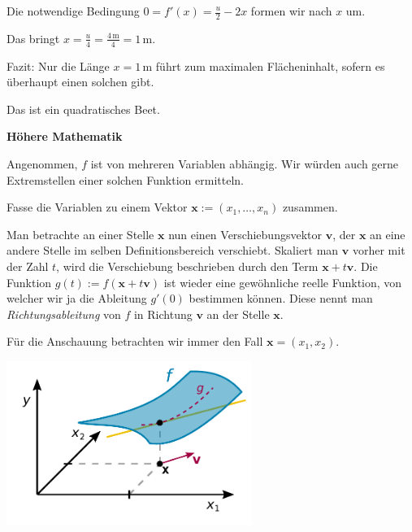 \documentclass{beamer}
\newcommand{\unit}[1]{\mathrm{#1}}
\newcommand{\strong}[1]{\textsf{\textbf{#1}}}
\begin{document}
\begin{frame}
Die notwendige Bedingung $0=f'(x)=\tfrac{u}{2}-2x$ formen wir nach
$x$ um.\pause

\vspace{0.8em}
Das bringt $x = \tfrac{u}{4} = \tfrac{4\,\unit{m}}{4} = 1\,\unit{m}$.
\pause

\vspace{0.8em}
Fazit: Nur die Länge $x = 1\,\unit{m}$ führt zum maximalen
Flächeninhalt, sofern es überhaupt einen solchen gibt.

\vspace{0.8em}
Das ist ein quadratisches Beet.
\end{frame}

\begin{frame}
\begin{center}
\strong{Höhere Mathematik}
\end{center}
\end{frame}

\begin{frame}
Angenommen, $f$ ist von mehreren Variablen abhängig. Wir würden
auch gerne Extremstellen einer solchen Funktion ermitteln.
\end{frame}

\begin{frame}
Fasse die Variablen zu einem Vektor
$\mathbf x:=(x_1,\ldots,x_n)$
zusammen.\pause

\vspace{0.8em}
Man betrachte an einer Stelle $\mathbf x$ nun einen Verschiebungsvektor
$\mathbf v$, der $\mathbf x$ an eine andere Stelle im selben
Definitionsbereich verschiebt. Skaliert man $\mathbf v$ vorher
mit der Zahl $t$, wird die Verschiebung beschrieben durch den Term
$\mathbf x+t\mathbf v$. Die Funktion
$g(t):=f(\mathbf x+t\mathbf v)$ ist wieder
eine gewöhnliche reelle Funktion, von welcher wir ja die Ableitung
$g'(0)$ bestimmen können. Diese nennt man \emph{Richtungsableitung}
von $f$ in Richtung $\mathbf v$ an der Stelle $\mathbf x$.
\end{frame}

\begin{frame}[t]
\vspace{2em}
Für die Anschauung betrachten wir immer den Fall
$\mathbf x = (x_1,x_2)$.
\pause

\vspace{-1em}
\begin{center}
\includegraphics[width=80mm]{img/Richtungsableitung.pdf}
\end{center}
\end{frame}
\end{document}
